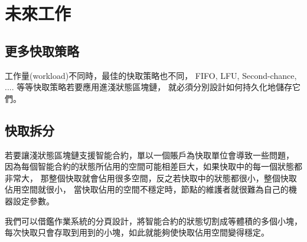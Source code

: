 \chapter{未來工作}
\label{c:future_work}

\section{更多快取策略}
工作量(workload)不同時，最佳的快取策略也不同，
FIFO, LFU, Second-chance, .... 等等快取策略若要應用進淺狀態區塊鏈，
就必須分別設計如何持久化地儲存它們。

\section{快取拆分}

若要讓淺狀態區塊鏈支援智能合約，單以一個賬戶為快取單位會導致一些問題，
因為每個智能合約的狀態所佔用的空間可能相差巨大，如果快取中的每一個狀態都非常大，
那整個快取就會佔用很多空間，反之若快取中的狀態都很小，整個快取佔用空間就很小，
當快取佔用的空間不穩定時，節點的維護者就很難為自己的機器設定參數。

我們可以借鑑作業系統的分頁設計，將智能合約的狀態切割成等體積的多個小塊，
每次快取只會存取到用到的小塊，如此就能夠使快取佔用空間變得穩定。

